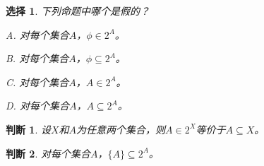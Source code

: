 \documentclass{article}
\newtheorem*{Ex}{选择}
\newtheorem*{yesno}{判断}
\begin{document}
\begin{CJK}{UTF8}{gbsn}
  \begin{Ex}
       下列命题中哪个是假的？

    A. 对每个集合$A$，$\phi \in 2^A$。

    B. 对每个集合$A$，$\phi \subseteq 2^A$。

    C. 对每个集合$A$，$A \in 2^A$。

    D. 对每个集合$A$，$A \subseteq 2^A$。

  \end{Ex}
  
  \begin{yesno}
        设$X$和$A$为任意两个集合，则$A \in 2^X$等价于$A \subseteq X$。
      \end{yesno}
\begin{yesno}
    对每个集合$A$，$\{A\}\subseteq 2^A$。  
\end{yesno}
      
\end{CJK}
\end{document}
